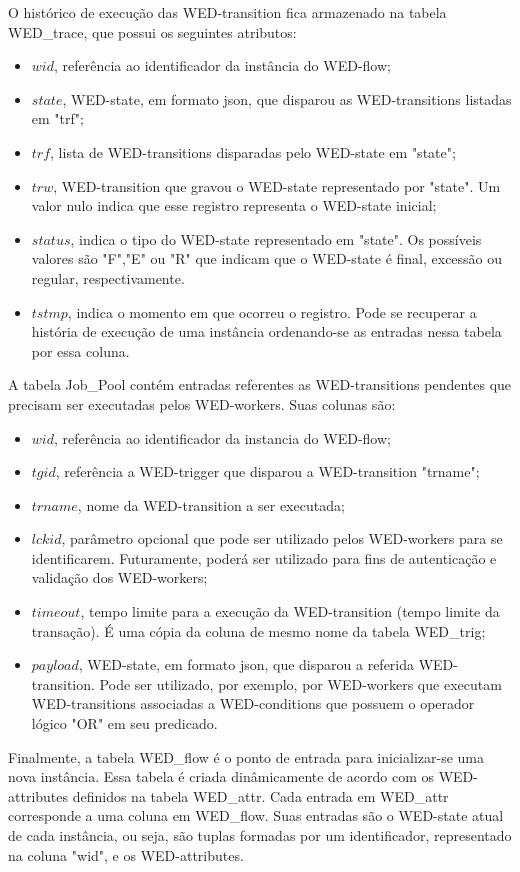 \documentclass[conference]{IEEEtran}
\begin{document}
O histórico de execução das WED-transition fica armazenado na tabela WED\_trace, que possui os seguintes atributos:
\begin{itemize}  
\item $wid$, referência ao identificador da instância do WED-flow;
\item $state$, WED-state, em formato json, que disparou as WED-transitions listadas em "trf";
\item $trf$, lista de WED-transitions disparadas pelo WED-state em "state";
\item $trw$, WED-transition que gravou o WED-state representado por "state". Um valor nulo indica que esse registro representa o WED-state inicial;
\item $status$, indica o tipo do WED-state representado em "state". Os possíveis valores são "F","E" ou "R" que indicam que o WED-state
           é final, excessão ou regular, respectivamente.
\item $tstmp$, indica o momento em que ocorreu o registro. Pode se recuperar a história de execução de uma instância ordenando-se
          as entradas nessa tabela por essa coluna.
\end{itemize}
  A tabela Job\_Pool contém entradas referentes as WED-transitions pendentes que precisam ser executadas pelos WED-workers.
Suas colunas são:
\begin{itemize}  
\item $wid$, referência ao identificador da instancia do WED-flow;
\item $tgid$, referência a WED-trigger que disparou a WED-transition "trname";
\item $trname$, nome da WED-transition a ser executada;
\item $lckid$, parâmetro opcional que pode ser utilizado pelos WED-workers para se identificarem. Futuramente, poderá ser utilizado
          para fins de autenticação e validação dos WED-workers;
\item $timeout$, tempo limite para a execução da WED-transition (tempo limite da transação). É uma cópia da coluna de mesmo
            nome da tabela WED\_trig;
\item $payload$, WED-state, em formato json, que disparou a referida WED-transition. Pode ser utilizado, por exemplo, por
            WED-workers que executam WED-transitions associadas a WED-conditions que possuem o operador lógico "OR" em 
            seu predicado.
\end{itemize}
  Finalmente, a tabela WED\_flow é o ponto de entrada para inicializar-se uma nova instância. Essa tabela é criada dinâmicamente
de acordo com os WED-attributes definidos na tabela WED\_attr. Cada entrada em WED\_attr corresponde a uma coluna em WED\_flow.
Suas entradas são o WED-state atual de cada instância, ou seja, são tuplas formadas por um identificador, representado
na coluna "wid", e os WED-attributes. 
\end{document}
